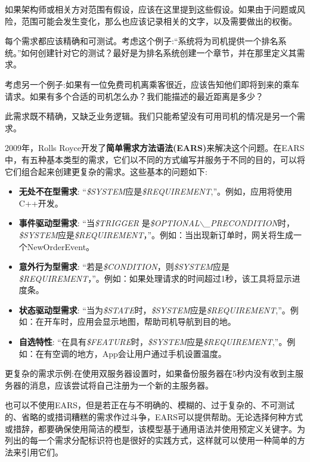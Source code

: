 如果架构师或相关方对范围有假设，应该在这里提到这些假设。如果由于问题或风险，范围可能会发生变化，那么也应该记录相关的文字，以及需要做出的权衡。


每个需求都应该精确和可测试。考虑这个例子:“系统将为司机提供一个排名系统。”如何创建针对它的测试？最好是为排名系统创建一个章节，并在那里定义其需求。

考虑另一个例子:如果有一位免费司机离乘客很近，应该告知他们即将到来的乘车请求。如果有多个合适的司机怎么办？我们能描述的最近距离是多少？

此需求既不精确，又缺乏业务逻辑。我们只能希望没有可用司机的情况是另一个需求。

2009年，Rolls Royce开发了\textbf{简单需求方法语法(EARS)}来解决这个问题。在EARS中，有五种基本类型的需求，它们以不同的方式编写并服务于不同的目的，可以将它们组合起来创建更复杂的需求。这些基本的问题如下:

\begin{itemize}
\item 
\textbf{无处不在型需求}: “\textit{\$SYSTEM}应是\textit{\$REQUIREMENT},”。例如，应用将使用C++开发。

\item 
\textbf{事件驱动型需求}: “当\textit{\$TRIGGER} 是\textit{\$OPTIONAL$\backslash$\_PRECONDITION}时，\textit{\$SYSTEM}应是\textit{\$REQUIREMENT}，”。例如：当出现新订单时，网关将生成一个NewOrderEvent。

\item 
\textbf{意外行为型需求}: “若是\textit{\$CONDITION}，则\textit{\$SYSTEM}应是\textit{\$REQUIREMENT}，”。例如：如果处理请求的时间超过1秒，该工具将显示进度条。

\item
\textbf{状态驱动型需求}: “当为\textit{\$STATE}时，\textit{\$SYSTEM}应是\textit{\$REQUIREMENT},”。例如：在开车时，应用会显示地图，帮助司机导航到目的地。

\item
\textbf{自选特性}: “在具有\textit{\$FEATURE}时，\textit{\$SYSTEM}应是\textit{\$REQUIREMENT},”。例如：在有空调的地方，App会让用户通过手机设置温度。
\end{itemize}

更复杂的需求示例:在使用双服务器设置时，如果备份服务器在5秒内没有收到主服务器的消息，应该尝试将自己注册为一个新的主服务器。

也可以不使用EARS，但是若正在与不明确的、模糊的、过于复杂的、不可测试的、省略的或措词糟糕的需求作过斗争，EARS可以提供帮助。无论选择何种方式或措辞，都要确保使用简洁的模型，该模型基于通用语法并使用预定义关键字。为列出的每一个需求分配标识符也是很好的实践方式，这样就可以使用一种简单的方法来引用它们。

